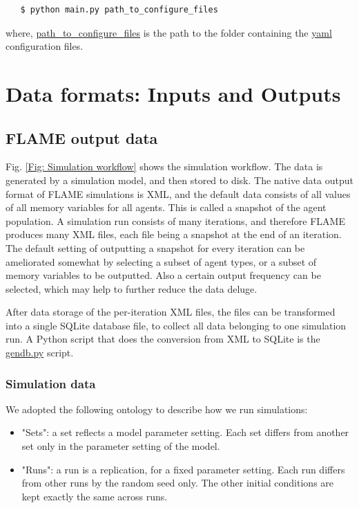 \documentclass[10pt,a4paper]{article}
\begin{document}
\begin{lstlisting}
   $ python main.py path_to_configure_files
\end{lstlisting}

where, \url{path_to_configure_files} is the path to the folder containing the \url{yaml} configuration files.

\section{Data formats: Inputs and Outputs}
\label{Sec: Data formats}

\subsection{FLAME output data}
Fig. \ref{Fig: Simulation workflow} shows the simulation workflow. The data is generated by a simulation model, and then stored to disk. The native data output format of FLAME simulations is XML, and the default data consists of all values of all memory variables for all agents. This is called a snapshot of the agent population. A simulation run consists of many iterations, and therefore FLAME produces many XML files, each file being a snapshot at the end of an iteration. The default setting of outputting a snapshot for every iteration can be ameliorated somewhat by selecting a subset of agent types, or a subset of memory variables to be outputted. Also a certain output frequency can be selected, which may help to further reduce the data deluge.

After data storage of the per-iteration XML files, the files can be transformed into a single SQLite database file, to collect all data belonging to one simulation run.
A Python script that does the conversion from XML to SQLite is the \url{gendb.py} script.

\subsubsection{Simulation data}
We adopted the following ontology to describe how we run simulations:

\begin{itemize}
\item "Sets": a set reflects a model parameter setting. Each set differs from another set only in the parameter setting of the model.

\item "Runs": a run is a replication, for a fixed parameter setting. Each run differs from other runs by the random seed only. The other initial conditions are kept exactly the same across runs.
\end{itemize}
\end{document}

